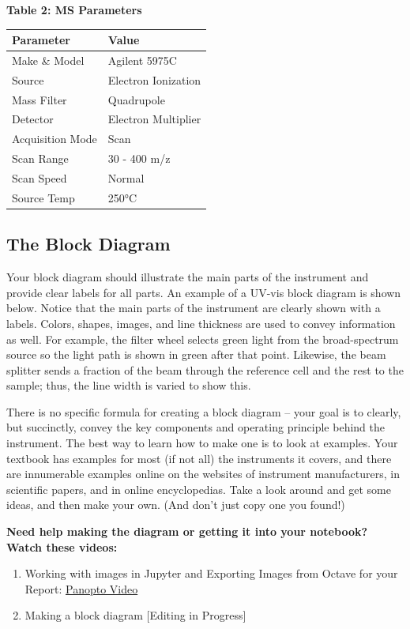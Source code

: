 \documentclass[]{tufte-book}
\providecommand{\tightlist}{%
  \setlength{\itemsep}{0pt}\setlength{\parskip}{0pt}}
\begin{document}
\textbf{Table 2: MS Parameters}

\begin{longtable}[]{@{}ll@{}}
\toprule
Parameter & Value\tabularnewline
\midrule
\endhead
Make \& Model & Agilent 5975C\tabularnewline
Source & Electron Ionization\tabularnewline
Mass Filter & Quadrupole\tabularnewline
Detector & Electron Multiplier\tabularnewline
Acquisition Mode & Scan\tabularnewline
Scan Range & 30 - 400 m/z\tabularnewline
Scan Speed & Normal\tabularnewline
Source Temp & 250°C\tabularnewline
\bottomrule
\end{longtable}

\hypertarget{the-block-diagram}{%
\subsection*{The Block Diagram}\label{the-block-diagram}}

Your block diagram should illustrate the main parts of the instrument and provide clear labels for all parts. An example of a UV-vis block diagram is shown below. Notice that the main parts of the instrument are clearly shown with a labels. Colors, shapes, images, and line thickness are used to convey information as well. For example, the filter wheel selects green light from the broad-spectrum source so the light path is shown in green after that point. Likewise, the beam splitter sends a fraction of the beam through the reference cell and the rest to the sample; thus, the line width is varied to show this.

There is no specific formula for creating a block diagram -- your goal is to clearly, but succinctly, convey the key components and operating principle behind the instrument. The best way to learn how to make one is to look at examples. Your textbook has examples for most (if not all) the instruments it covers, and there are innumerable examples online on the websites of instrument manufacturers, in scientific papers, and in online encyclopedias. Take a look around and get some ideas, and then make your own. (And don't just copy one you found!)

\textbf{Need help making the diagram or getting it into your notebook? Watch these videos:}

\begin{enumerate}
\def\labelenumi{\arabic{enumi}.}
\tightlist
\item
  Working with images in Jupyter and Exporting Images from Octave for your Report: \href{https://wcu.hosted.panopto.com/Panopto/Pages/Viewer.aspx?id=57aa8a5b-df1d-4004-927a-ab90001bc595}{Panopto Video}
\item
  Making a block diagram {[}Editing in Progress{]}
\end{enumerate}
\end{document}
